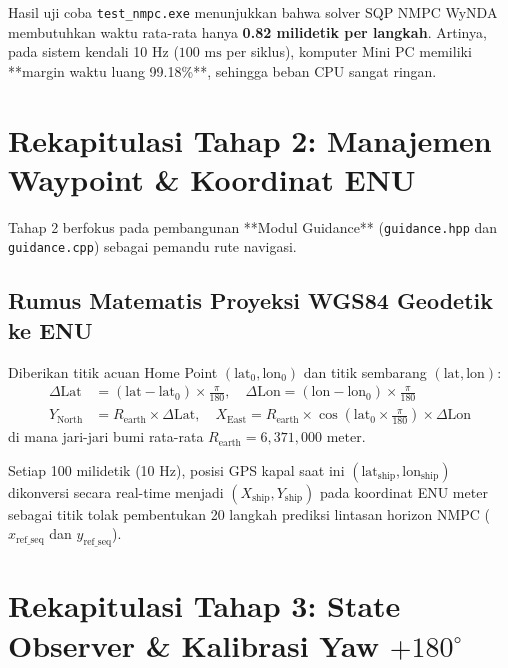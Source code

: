 \documentclass[11pt,a4paper]{article}
\begin{document}
Hasil uji coba \texttt{test\_nmpc.exe} menunjukkan bahwa solver SQP NMPC WyNDA membutuhkan waktu rata-rata hanya \textbf{0.82 milidetik per langkah}. Artinya, pada sistem kendali 10 Hz ($100\text{ ms}$ per siklus), komputer Mini PC memiliki **margin waktu luang 99.18\%**, sehingga beban CPU sangat ringan.

\section{Rekapitulasi Tahap 2: Manajemen Waypoint \& Koordinat ENU}

Tahap 2 berfokus pada pembangunan **Modul Guidance** (\texttt{guidance.hpp} dan \texttt{guidance.cpp}) sebagai pemandu rute navigasi.

\subsection{Rumus Matematis Proyeksi WGS84 Geodetik ke ENU}
Diberikan titik acuan Home Point $(\text{lat}_0, \text{lon}_0)$ dan titik sembarang $(\text{lat}, \text{lon})$:
\begin{align}
    \Delta \text{Lat} &= (\text{lat} - \text{lat}_0) \times \frac{\pi}{180}, \quad \Delta \text{Lon} = (\text{lon} - \text{lon}_0) \times \frac{\pi}{180} \\
    Y_{\text{North}} &= R_{\text{earth}} \times \Delta \text{Lat}, \quad X_{\text{East}} = R_{\text{earth}} \times \cos\left(\text{lat}_0 \times \frac{\pi}{180}\right) \times \Delta \text{Lon}
\end{align}
di mana jari-jari bumi rata-rata $R_{\text{earth}} = 6,371,000\text{ meter}$.

Setiap 100 milidetik (10 Hz), posisi GPS kapal saat ini $(\text{lat}_{\text{ship}}, \text{lon}_{\text{ship}})$ dikonversi secara real-time menjadi $(X_{\text{ship}}, Y_{\text{ship}})$ pada koordinat ENU meter sebagai titik tolak pembentukan 20 langkah prediksi lintasan horizon NMPC ($x_{\text{ref\_seq}}$ dan $y_{\text{ref\_seq}}$).

\section{Rekapitulasi Tahap 3: State Observer \& Kalibrasi Yaw $+180^\circ$}
\end{document}
